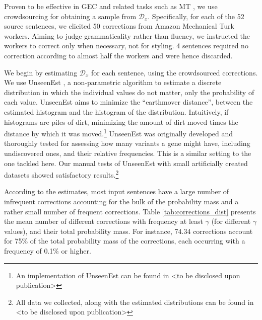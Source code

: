 \documentclass[letterpaper, 11pt]{article}
\newcommand{\com}[1]{}
\begin{document}
Proven to be effective in GEC \cite{madnani2011they} and related tasks such as MT \cite{zaidan2011crowdsourcing, post2012constructing}, 
we use crowdsourcing for obtaining a sample from $\mathcal{D}_x$. Specifically, for each of the 52 source sentences, 
we elicited 50 corrections from Amazon Mechanical Turk workers.
Aiming to judge grammaticality rather than fluency, we instructed the workers to
correct only when necessary, not for styling.
4 sentences required no correction according to almost half the workers and were hence discarded.

We begin by estimating $\mathcal{D}_x$ for each sentence, using the crowdsourced corrections.
We use {\sc UnseenEst} \cite{zou2015quantifying}, a non-parametric algorithm to
estimate a discrete distribution in which the individual values do not matter, only the probability of each value. 
{\sc UnseenEst} aims to minimize the ``earthmover distance'', between the estimated histogram and the histogram of the distribution. 
Intuitively, if histograms are piles of dirt, minimizing the amount of dirt moved times the distance by 
which it was moved.\footnote{An implementation of {\sc UnseenEst} can be found in <to be disclosed upon publication>\com{\href{https://github.com/borgr/unseenest}}} 
{\sc UnseenEst} was originally developed and thoroughly tested for assessing how many
variants a gene might have, including undiscovered ones, and their relative frequencies.
This is a similar setting to the one tackled here.
Our manual tests of {\sc UnseenEst} with small artificially created datasets
showed satisfactory results.\footnote{All data we collected, along with the estimated
  distributions can be found in <to be disclosed upon publication>}

According to the estimates, most input sentences have a large number of
infrequent corrections accounting for the bulk of the probability mass
and a rather small number of frequent corrections.
Table \ref{tab:corrections_dist} presents the mean number of different corrections with frequency at least $\gamma$ (for different $\gamma$ values), and their total probability mass.
For instance, 74.34 corrections account for 75\% of the total probability mass of the corrections, each occurring with a frequency of 0.1\% or higher.
\end{document}
